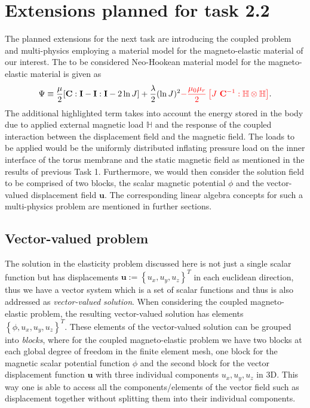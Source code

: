 \section{Extensions planned for task 2.2}
The planned extensions for the next task are introducing the coupled problem and multi-physics employing a material model for the magneto-elastic material of our interest. The to be considered Neo-Hookean material model for the magneto-elastic material is given as
\begin{equation}
\Psi \equiv \dfrac{\mu}{2} [\mathbf{C} : \mathbf{I} - \mathbf{I} : \mathbf{I} - 2 \ln J] + \dfrac{\lambda}{2} (\ln J)^2 \textcolor{red}{- \dfrac{\mu_0 \mu_r}{2} \left[ J \ \mathbf{C}^{-1} : \mathbb{H} \otimes \mathbb{H} \right]}.
\end{equation}
The additional highlighted term takes into account the energy stored in the body due to applied external magnetic load $\mathbb{H}$ and the response of the coupled interaction between the displacement field and the magnetic field. The loads to be applied would be the uniformly distributed inflating pressure load on the inner interface of the torus membrane and the static magnetic field as mentioned in the results of previous Task 1. Furthermore, we would then consider the solution field to be comprised of two blocks, the scalar magnetic potential $\phi$ and the vector-valued displacement field $\mathbf{u}$. The corresponding linear algebra concepts for such a multi-physics problem are mentioned in further sections.

\subsection{\textbf{Vector-valued problem}} The solution in the elasticity problem discussed here is not just a single scalar function but has displacements $\mathbf{u} := \left\lbrace u_x, u_y, u_z \right\rbrace^T$ in each euclidean direction, thus we have a vector system which is a set of scalar functions and thus is also addressed as \textit{vector-valued solution}. When considering the coupled magneto-elastic problem, the resulting vector-valued solution has elements $\left\lbrace \phi, u_x, u_y, u_z \right\rbrace^T$. These elements of the vector-valued solution can be grouped into \textit{blocks}, where for the coupled magneto-elastic problem we have two blocks at each global degree of freedom in the finite element mesh, one block for the magnetic scalar potential function $\phi$ and the second block for the vector displacement function $\mathbf{u}$ with three individual components $u_x, u_y, u_z$ in 3D. This way one is able to access all the components/elements of the vector field such as displacement together without splitting them into their individual components. 

